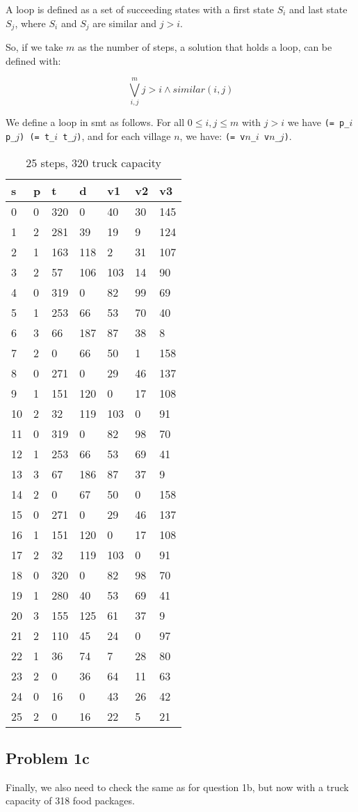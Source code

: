 \documentclass[a4paper]{article}
\begin{document}
	A loop is defined as a set of succeeding states with a first state $S_i$ and last state $S_j$, where $S_i$ and $S_j$ are similar and $j > i$.
	
	So, if we take $m$ as the number of steps, a solution that holds a loop, can be defined with:
	
	$$\bigvee_{i, j}^m j > i \wedge similar(i, j)$$
	
	We define a loop in smt as follows. For all $0 \leq i, j \leq m$ with $j > i$ we have {\tt (= p\_$i$ p\_$j$) (= t\_$i$ t\_$j$)}, and for each village $n$, we have: {\tt (= v$n$\_$i$ v$n$\_$j$)}.
	
	\begin{longtable}[c]{@{}|l|l|l|l|l|l|l|@{}}
		\caption{25 steps, 320 truck capacity}\\
		\toprule
		s & p & t & d & v1 & v2 & v3\tabularnewline
		\midrule
		\endhead
		0 & 0 & 320 & 0 & 40 & 30 & 145\tabularnewline
		1 & 2 & 281 & 39 & 19 & 9 & 124\tabularnewline
		2 & 1 & 163 & 118 & 2 & 31 & 107\tabularnewline
		3 & 2 & 57 & 106 & 103 & 14 & 90\tabularnewline
		4 & 0 & 319 & 0 & 82 & 99 & 69\tabularnewline
		5 & 1 & 253 & 66 & 53 & 70 & 40\tabularnewline
		6 & 3 & 66 & 187 & 87 & 38 & 8\tabularnewline
		7 & 2 & 0 & 66 & 50 & 1 & 158\tabularnewline
		\rowcolor{Highlight}
		8 & 0 & 271 & 0 & 29 & 46 & 137\tabularnewline
		9 & 1 & 151 & 120 & 0 & 17 & 108\tabularnewline
		10 & 2 & 32 & 119 & 103 & 0 & 91\tabularnewline
		11 & 0 & 319 & 0 & 82 & 98 & 70\tabularnewline
		12 & 1 & 253 & 66 & 53 & 69 & 41\tabularnewline
		13 & 3 & 67 & 186 & 87 & 37 & 9\tabularnewline
		14 & 2 & 0 & 67 & 50 & 0 & 158\tabularnewline
		\rowcolor{Highlight}
		15 & 0 & 271 & 0 & 29 & 46 & 137\tabularnewline
		16 & 1 & 151 & 120 & 0 & 17 & 108\tabularnewline
		17 & 2 & 32 & 119 & 103 & 0 & 91\tabularnewline
		18 & 0 & 320 & 0 & 82 & 98 & 70\tabularnewline
		19 & 1 & 280 & 40 & 53 & 69 & 41\tabularnewline
		20 & 3 & 155 & 125 & 61 & 37 & 9\tabularnewline
		21 & 2 & 110 & 45 & 24 & 0 & 97\tabularnewline
		22 & 1 & 36 & 74 & 7 & 28 & 80\tabularnewline
		23 & 2 & 0 & 36 & 64 & 11 & 63\tabularnewline
		24 & 0 & 16 & 0 & 43 & 26 & 42\tabularnewline
		25 & 2 & 0 & 16 & 22 & 5 & 21\tabularnewline
		\bottomrule
	\end{longtable}
	
	
	\subsection*{Problem 1c}
	Finally, we also need to check the same as for question 1b, but now with a truck capacity of 318 food packages.
	
\end{document}
